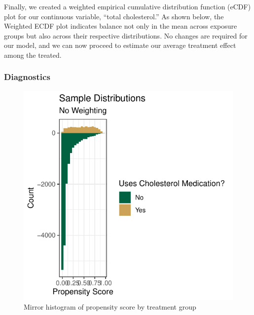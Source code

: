 \documentclass[useAMS,usenatbib,referee]{biom}
\begin{document}
Finally, we created a weighted empirical cumulative distribution
function (eCDF) plot for our continuous variable, ``total cholesterol.''
As shown below, the Weighted ECDF plot indicates balance not only in the
mean across exposure groups but also across their respective
distributions. No changes are required for our model, and we can now
proceed to estimate our average treatment effect among the treated.

\hypertarget{diagnostics}{%
\subsubsection{Diagnostics}\label{diagnostics}}

\begin{figure}
\centering
\includegraphics{final-project_files/figure-latex/fig_diag1-1.pdf}
\caption{Mirror histogram of propensity score by treatment group}
\end{figure}
\end{document}
